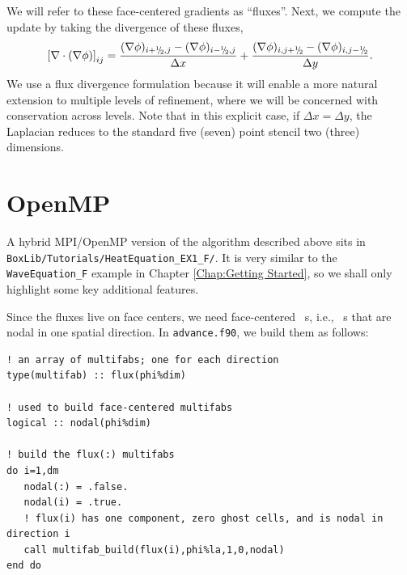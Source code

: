 We will refer to these face-centered gradients as ``fluxes''.
Next, we compute the update by taking the divergence of these fluxes,
\begin{equation}
\left[\nabla\cdot(\nabla\phi)\right]_{ij} = \frac{(\nabla\phi)_{i+\myhalf,j}-(\nabla\phi)_{i-\myhalf,j}}{\Delta x} + \frac{(\nabla\phi)_{i,j+\myhalf}-(\nabla\phi)_{i,j-\myhalf}}{\Delta y}.
\end{equation}
We use a flux divergence formulation because it will enable a more natural 
extension to multiple levels of refinement, where we will be concerned with
conservation across levels.  Note that in this explicit case, if $\Delta x = \Delta y$, 
the Laplacian reduces to the standard five (seven) point stencil two (three) dimensions.  

\section{OpenMP}\label{Sec:OpenMP}

A hybrid MPI/OpenMP version of the algorithm described above sits in 
{\tt BoxLib/Tutorials/HeatEquation\_EX1\_F/}.  It is very similar to the
{\tt WaveEquation\_F} example in Chapter \ref{Chap:Getting Started}, so we shall
only highlight some key additional features.

Since the fluxes live on face centers, we need face-centered \MultiFab\ s, i.e.,
\MultiFab\ s that are nodal in one spatial direction.  In {\tt advance.f90},
we build them as follows:
\begin{lstlisting}[backgroundcolor=\color{light-green}]
! an array of multifabs; one for each direction
type(multifab) :: flux(phi%dim) 

! used to build face-centered multifabs
logical :: nodal(phi%dim) 

! build the flux(:) multifabs
do i=1,dm
   nodal(:) = .false.
   nodal(i) = .true.
   ! flux(i) has one component, zero ghost cells, and is nodal in direction i
   call multifab_build(flux(i),phi%la,1,0,nodal)
end do
\end{lstlisting}

